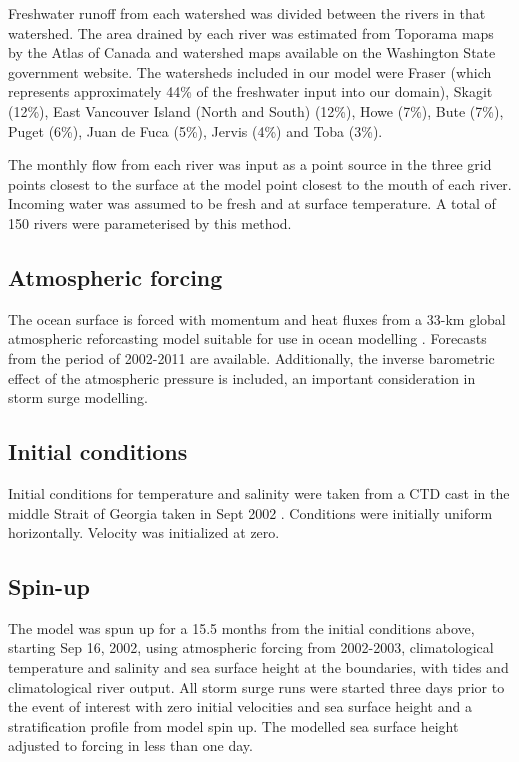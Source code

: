 \documentclass[pdftex,10pt]{article}
\begin{document}
Freshwater runoff from each watershed was divided between the rivers in that watershed. The area drained by each river was estimated from Toporama maps by the Atlas of Canada and watershed maps available on the Washington State government website. The watersheds included in our model were Fraser (which represents approximately 44\% of the freshwater input into our domain), Skagit (12\%), East Vancouver Island (North and South) (12\%), Howe (7\%), Bute (7\%), Puget (6\%), Juan de Fuca (5\%), Jervis (4\%) and Toba (3\%). 

The monthly flow from each river was input as a point source in the three grid points closest to the surface at the model point closest to the mouth of each river. Incoming water was assumed to be fresh and at surface temperature. A total of 150 rivers were parameterised by this method. 


\subsection{Atmospheric forcing}
The ocean surface is forced with momentum and heat fluxes from a 33-km global atmospheric reforcasting model suitable for use in ocean modelling \citep{smith2013new}. Forecasts from the period of 2002-2011 are available. Additionally, the inverse barometric effect of the atmospheric pressure is included, an important consideration in storm surge modelling. 

\subsection{Initial conditions}
Initial conditions for temperature and salinity were taken from a CTD cast in the middle Strait of Georgia taken in Sept 2002 \citep{pawlowiczetal2007}.  Conditions were initially uniform horizontally.  Velocity was initialized at zero. 

\subsection{Spin-up}
The model was spun up for a 15.5 months from the initial conditions above, starting Sep 16, 2002, using atmospheric forcing from 2002-2003, climatological temperature and salinity and sea surface height at the boundaries, with tides and climatological river output.  All storm surge runs were started three days prior to the event of interest with zero initial velocities and sea surface height and a stratification profile from model spin up. The modelled sea surface height adjusted to forcing in less than one day. 
\end{document}
